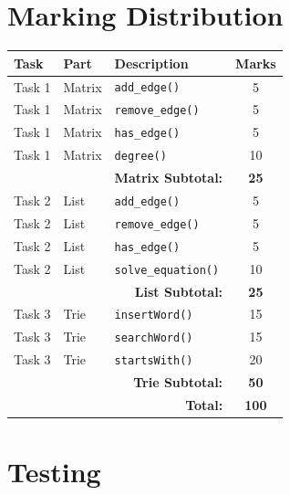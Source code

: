 \documentclass[11pt]{article}
\begin{document}
\newpage
\tableofcontents
\newpage

\section{Marking Distribution}

\begin{table}[h!]
\centering
\renewcommand{\arraystretch}{1.3}
\begin{tabularx}{0.8\textwidth}{llX c}
\toprule
\rowcolor{tableHeadBlue}
\textbf{Task} & \textbf{Part} & \textbf{Description} & \textbf{Marks} \\
\midrule
Task 1 & Matrix & \texttt{add\_edge()} & 5 \\
Task 1 & Matrix & \texttt{remove\_edge()} & 5 \\
Task 1 & Matrix & \texttt{has\_edge()} & 5 \\
Task 1 & Matrix & \texttt{degree()} & 10 \\
\midrule
& & \multicolumn{1}{r}{\textbf{Matrix Subtotal:}} & \textbf{25} \\
\midrule
Task 2 & List & \texttt{add\_edge()} & 5 \\
Task 2 & List & \texttt{remove\_edge()} & 5 \\
Task 2 & List & \texttt{has\_edge()} & 5 \\
Task 2 & List & \texttt{solve\_equation()} & 10 \\
\midrule
& & \multicolumn{1}{r}{\textbf{List Subtotal:}} & \textbf{25} \\
\midrule
Task 3 & Trie & \texttt{insertWord()} & 15 \\
Task 3 & Trie & \texttt{searchWord()} & 15 \\
Task 3 & Trie & \texttt{startsWith()} & 20 \\
\midrule
& & \multicolumn{1}{r}{\textbf{Trie Subtotal:}} & \textbf{50} \\
\midrule
& & \multicolumn{1}{r}{\textbf{Total:}} & \textbf{100} \\
\bottomrule
\end{tabularx}
\end{table}

\vspace{0.5cm}

\section{Testing}
\end{document}

